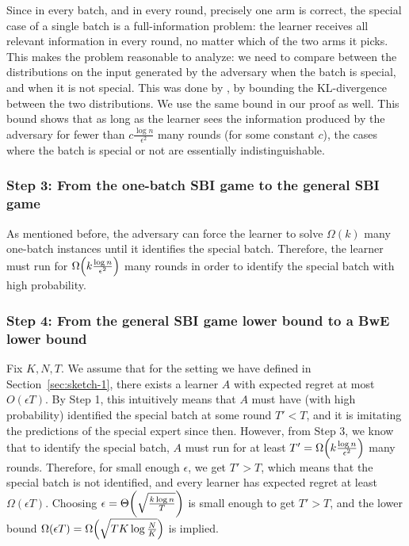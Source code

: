 \documentclass[a4paper,11pt]{article}
\theoremstyle{definition}
\begin{document}
Since in every batch, and in every round, precisely one arm is correct, the special case of a single batch is a full-information problem: the learner receives all relevant information in every round, no matter which of the two arms it picks. This makes the problem reasonable to analyze: we need to compare between the distributions on the input generated by the adversary when the batch is special, and when it is not special. This was done by \cite{ito2024minimax}, by bounding the KL-divergence between the two distributions. We use the same bound in our proof as well. This bound shows that as long as the learner sees the information produced by the adversary for fewer than $c \frac{\log n}{\epsilon^2}$ many rounds (for some constant $c$), the cases where the batch is special or not are essentially indistinguishable.

\subsubsection{Step 3: From the one-batch SBI game to the general SBI game} \label{sec:sketch-one-to-many}
As mentioned before, the adversary can force the learner to solve $\Omega(k)$ many one-batch instances until it identifies the special batch. Therefore, the learner must run for $\Omega\mleft( k \frac{\log n}{\epsilon^2} \mright)$ many rounds in order to identify the special batch with high probability.

\subsubsection{Step 4: From the general SBI game lower bound to a BwE lower bound}
Fix $K,N,T$. We assume that for the setting we have defined in Section~\ref{sec:sketch-1}, there exists a learner $A$ with expected regret at most $O(\epsilon T)$. By Step 1, this intuitively means that $A$ must have (with high probability) identified the special batch at some round $T' < T$, and it is imitating the predictions of the special expert since then. However, from Step 3, we know that to identify the special batch, $A$ must run for at least $T' = \Omega \mleft(k \frac{\log n}{\epsilon^2} \mright)$ many rounds. Therefore, for small enough $\epsilon$, we get $T' > T$, which means that the special batch is not identified, and every learner has expected regret at least $\Omega(\epsilon T)$. Choosing $\epsilon = \Theta\mleft( \sqrt{\frac{k \log n}{T}} \mright)$ is small enough to get $T' > T$, and the lower bound $\Omega(\epsilon T) = \Omega \mleft( \sqrt{T K \log \frac{N}{K}} \mright)$ is implied.
\end{document}
